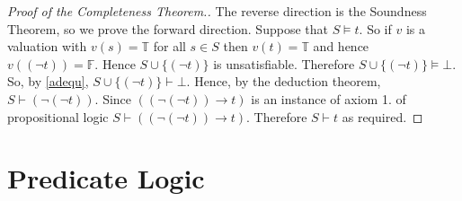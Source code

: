 \documentclass[11pt]{article}
\newcommand{\PF}{\mathrm{S}}
\newcommand{\proves}{\vdash}
\newtheorem{theorem}{Theorem}[section]
\newcommand{\mcal}[1]{\mathcal{#1}}
\newcommand{\F}{\mathbb{F}}
\newcommand{\T}{\mathbb{T}}
\begin{document}
\begin{proof}[Proof of the Completeness Theorem.]
The reverse direction is the Soundness Theorem, so we prove the forward direction. Suppose that $S\models t$. So if $v$ is a valuation with $v(s)=\T$ for all $s\in S$ then $v(t)=\T$ and hence $v((\neg t))=\F$. Hence $S\cup\{(\neg t)\}$ is unsatisfiable. Therefore $S\cup\{(\neg t)\}\models \bot$. So, by \ref{adequ}, $S\cup\{(\neg t)\}\vdash \bot$. Hence, by the deduction theorem, $S\vdash (\neg (\neg t))$. Since $((\neg (\neg t))\rightarrow t)$ is an instance of axiom 1. of propositional logic $S\proves ((\neg (\neg t))\rightarrow t)$. Therefore $S\proves t$ as required.
\end{proof}

%
%
%
%








\section{Predicate Logic}
\end{document}
